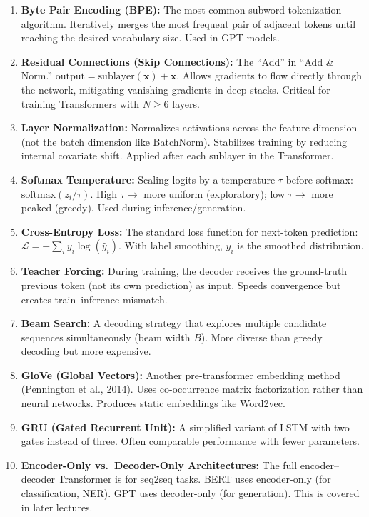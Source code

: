 \documentclass[11pt, a4paper]{article}
\begin{document}
\begin{enumerate}[leftmargin=2em]
  \item \textbf{Byte Pair Encoding (BPE):} The most common subword tokenization algorithm. Iteratively merges the most frequent pair of adjacent tokens until reaching the desired vocabulary size. Used in GPT models.

  \item \textbf{Residual Connections (Skip Connections):} The ``Add'' in ``Add \& Norm.'' $\text{output} = \text{sublayer}(\mathbf{x}) + \mathbf{x}$. Allows gradients to flow directly through the network, mitigating vanishing gradients in deep stacks. Critical for training Transformers with $N \geq 6$ layers.

  \item \textbf{Layer Normalization:} Normalizes activations across the feature dimension (not the batch dimension like BatchNorm). Stabilizes training by reducing internal covariate shift. Applied after each sublayer in the Transformer.

  \item \textbf{Softmax Temperature:} Scaling logits by a temperature $\tau$ before softmax: $\text{softmax}(z_i / \tau)$. High $\tau \to$ more uniform (exploratory); low $\tau \to$ more peaked (greedy). Used during inference/generation.

  \item \textbf{Cross-Entropy Loss:} The standard loss function for next-token prediction: $\mathcal{L} = -\sum_i y_i \log(\hat{y}_i)$. With label smoothing, $y_i$ is the smoothed distribution.

  \item \textbf{Teacher Forcing:} During training, the decoder receives the ground-truth previous token (not its own prediction) as input. Speeds convergence but creates train--inference mismatch.

  \item \textbf{Beam Search:} A decoding strategy that explores multiple candidate sequences simultaneously (beam width $B$). More diverse than greedy decoding but more expensive.

  \item \textbf{GloVe (Global Vectors):} Another pre-transformer embedding method (Pennington et al., 2014). Uses co-occurrence matrix factorization rather than neural networks. Produces static embeddings like Word2vec.

  \item \textbf{GRU (Gated Recurrent Unit):} A simplified variant of LSTM with two gates instead of three. Often comparable performance with fewer parameters.

  \item \textbf{Encoder-Only vs.\ Decoder-Only Architectures:} The full encoder--decoder Transformer is for seq2seq tasks. BERT uses encoder-only (for classification, NER). GPT uses decoder-only (for generation). This is covered in later lectures.
\end{enumerate}
\end{document}
